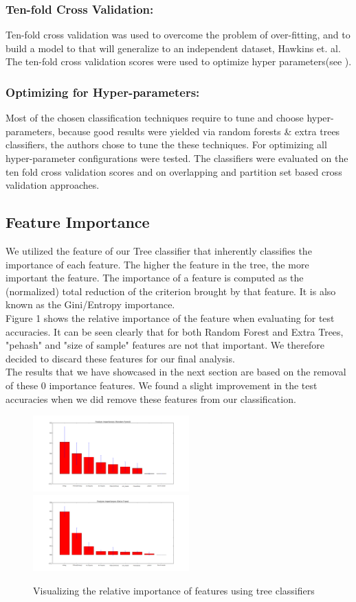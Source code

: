 \documentclass{llncs}
\begin{document}
\subsubsection{Ten-fold Cross Validation:} Ten-fold cross validation was used to overcome the problem of over-fitting, and to build a model to that will generalize to an independent dataset, Hawkins et. al. The ten-fold cross validation scores were used to optimize hyper parameters(see \cite{hawkins:eke}). 

\subsubsection{Optimizing for Hyper-parameters:} Most  of the chosen classification techniques require to tune and choose hyper-parameters, because good results were yielded via random forests \& extra trees classifiers, the authors chose to tune the these techniques. For optimizing all hyper-parameter configurations were tested. The classifiers were evaluated on the ten fold cross validation scores and on overlapping and partition set based cross validation approaches.

\subsection{Feature Importance}
We utilized the feature of our Tree classifier that inherently classifies the importance of each feature. The higher the feature in the tree, the more important the feature. The importance of a feature is computed as the (normalized) total reduction of the criterion brought by that feature. It is also known as the Gini/Entropy importance.\\
Figure 1 shows the relative importance of the feature when evaluating for test accuracies. It can be seen clearly that for both Random Forest and Extra Trees, "pehash" and "size of sample" features are not that important. We therefore decided to discard these features for our final analysis.\\
The results that we have showcased in the next section are based on the removal of these 0 importance features. We found a slight improvement in the test accuracies when we did remove these features from our classification. 

\begin{figure}[h]
	\includegraphics[width=6cm]{random_forest_feature_importances}
	\includegraphics[width=6cm]{extra_trees_feature_importances}
	\centering
	\caption{Visualizing the relative importance of features using tree classifiers}
\end{figure}
\end{document}
